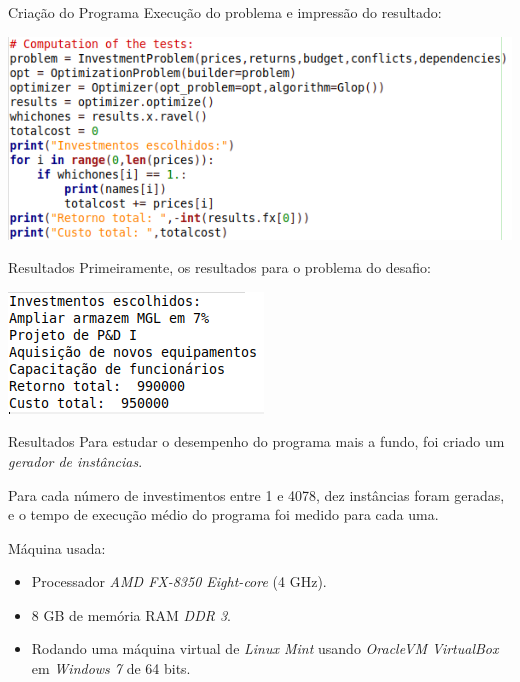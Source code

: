 \documentclass{beamer}
\begin{document}
\begin{frame}{Criação do Programa}
Execução do problema e impressão do resultado:
\begin{center}
\includegraphics[scale=0.4]{CONCLUSION_FOR_PRESENTATION.png}
\end{center}
\end{frame}

\begin{frame}{Resultados}
Primeiramente, os resultados para o problema do desafio:\pause
\begin{center}
\includegraphics[scale=0.8]{RESULT_FOR_PRESENTATION.png}
\end{center}
\end{frame}

\begin{frame}{Resultados}
Para estudar o desempenho do programa mais a fundo, foi criado um
\emph{gerador de instâncias}.\pause

Para cada número de investimentos entre 1 e 4078, dez instâncias foram geradas,
e o tempo de execução médio do programa foi medido para cada uma.\pause

Máquina usada:\pause
\begin{itemize}
\item Processador \emph{AMD FX-8350 Eight-core} (4 GHz).\pause
\item 8 GB de memória RAM \emph{DDR 3}.\pause
\item Rodando uma máquina virtual de \emph{Linux Mint} usando \emph{OracleVM VirtualBox} 
em \emph{Windows 7} de 64 bits.
\end{itemize}
\end{frame}
\end{document}
